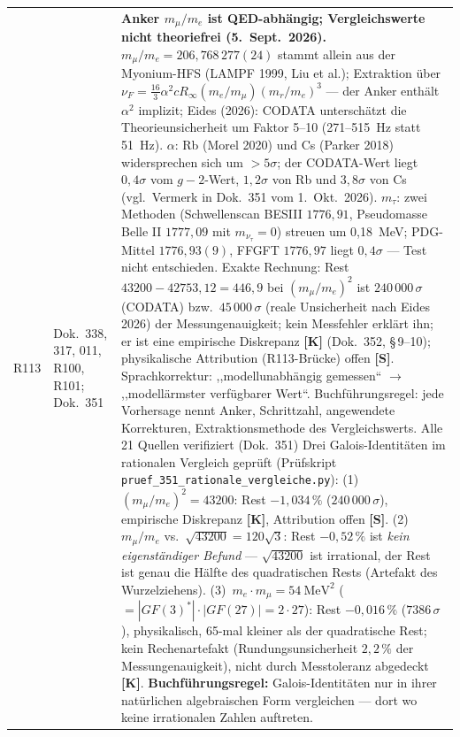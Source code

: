 \begin{longtable}{@{}p{0.9cm}p{3.1cm}p{10.2cm}@{}}
R113 & Dok.~338, 317, 011, R100, R101; Dok.~351 & \textbf{Anker $m_\mu/m_e$ ist QED-abhängig; Vergleichswerte nicht theoriefrei \QM{} (5.~Sept.~2026).} $m_\mu/m_e=206{,}768\,277(24)$ stammt allein aus der Myonium-HFS (LAMPF 1999, Liu et al.); Extraktion über $\nu_F=\tfrac{16}{3}\alpha^2cR_\infty(m_e/m_\mu)(m_r/m_e)^3$ --- der Anker enthält $\alpha^2$ implizit; Eides (2026): CODATA unterschätzt die Theorieunsicherheit um Faktor 5--10 (271--515~Hz statt 51~Hz). $\alpha$: Rb (Morel 2020) und Cs (Parker 2018) widersprechen sich um $>5\sigma$; der CODATA-Wert liegt $0{,}4\sigma$ vom $g-2$-Wert, $1{,}2\sigma$ von Rb und $3{,}8\sigma$ von Cs (vgl.\ Vermerk in Dok.~351 vom 1.~Okt.~2026). $m_\tau$: zwei Methoden (Schwellenscan BESIII $1776{,}91$, Pseudomasse Belle II $1777{,}09$ mit $m_{\nu_\tau}=0$) streuen um 0{,}18~MeV; PDG-Mittel $1776{,}93(9)$, FFGFT $1776{,}97$ liegt $0{,}4\sigma$ --- Test nicht entschieden. Exakte Rechnung: Rest $43200-42753{,}12=446{,}9$ bei $(m_\mu/m_e)^2$ ist $240\,000\,\sigma$ (CODATA) bzw.\ $45\,000\,\sigma$ (reale Unsicherheit nach Eides 2026) der Messungenauigkeit; kein Messfehler erklärt ihn; er ist eine empirische Diskrepanz \textbf{[K]} (Dok.~352, §\,9--10); physikalische Attribution (R113-Brücke) offen \textbf{[S]}. Sprachkorrektur: ,,modellunabhängig gemessen`` $\to$ ,,modellärmster verfügbarer Wert``. Buchführungsregel: jede Vorhersage nennt Anker, Schrittzahl, angewendete Korrekturen, Extraktionsmethode des Vergleichswerts. Alle 21 Quellen verifiziert (Dok.~351) Drei Galois-Identitäten im rationalen Vergleich geprüft (Prüfskript \texttt{pruef\_351\_rationale\_vergleiche.py}): (1)~$(m_\mu/m_e)^2=43200$: Rest $-1{,}034\,\%$ ($240\,000\,\sigma$), empirische Diskrepanz \textbf{[K]}, Attribution offen \textbf{[S]}. (2)~$m_\mu/m_e$ vs.\ $\sqrt{43200}=120\sqrt{3}$: Rest $-0{,}52\,\%$ ist \emph{kein eigenständiger Befund} --- $\sqrt{43200}$ ist irrational, der Rest ist genau die Hälfte des quadratischen Rests (Artefakt des Wurzelziehens). (3)~$m_e\cdot m_\mu=54~\text{MeV}^2$ ($=|GF(3)^*|\cdot|GF(27)|=2\cdot27$): Rest $-0{,}016\,\%$ ($7386\,\sigma$), physikalisch, 65-mal kleiner als der quadratische Rest; kein Rechenartefakt (Rundungsunsicherheit $2{,}2\,\%$ der Messungenauigkeit), nicht durch Messtoleranz abgedeckt \textbf{[K]}. \textbf{Buchführungsregel:} Galois-Identitäten nur in ihrer natürlichen algebraischen Form vergleichen --- dort wo keine irrationalen Zahlen auftreten. \\

\end{longtable}

